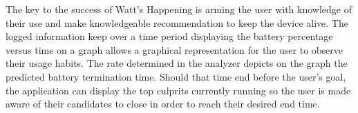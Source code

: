 The key to the success of Watt's Happening is arming the user with knowledge of their use and make knowledgeable recommendation to keep the device alive.  
The logged information keep over a time period displaying the battery percentage versus time on a graph allows a graphical representation for the user to observe their usage habits. 
The rate determined in the analyzer depicts on the graph the predicted battery termination time.  
Should that time end before the user's goal, the application can display the top culprits currently running so the user is made aware of their candidates to close in order to reach their desired end time.

